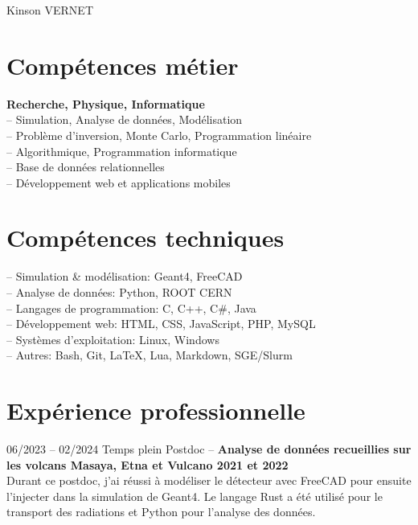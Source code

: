 \documentclass[
	10pt,
]{FreemanCV}
\begin{document}
\begin{paracol}{2}

\parbox[][0.11\textheight][c]{\linewidth}{
	\centering
	{\sffamily\Huge Kinson VERNET}
}


\section{Comp\'etences m\'etier}

\jobentry
	{}
	{}
	{}
	{}
	{\textbf{Recherche, Physique, Informatique}}\\
	{	
	-- Simulation, Analyse de donn\'ees, Mod\'elisation\\
	-- Problème d’inversion, Monte Carlo, Programmation lin\'eaire\\
	-- Algorithmique, Programmation informatique\\
	-- Base de donn\'ees relationnelles\\
	-- D\'eveloppement web et applications mobiles
	}
\medskip


\section{Comp\'etences techniques}

\jobentry
	{}
	{}
	{}
	{}
	{
	-- Simulation \& mod\'elisation: Geant4, FreeCAD\\
	-- Analyse de donn\'ees: Python, ROOT CERN\\
	-- Langages de programmation: C, C++, C\#, Java\\
	-- D\'eveloppement web: HTML, CSS, JavaScript, PHP, MySQL\\
	-- Systèmes d'exploitation: Linux, Windows\\
	-- Autres: Bash, Git, LaTeX, Lua, Markdown, SGE/Slurm
	}
\medskip


\section{Exp\'erience professionnelle}

\jobentry
	{06/2023 -- 02/2024}
	{Temps plein}
	{Postdoc -- \uca}
	{}
	{\textbf{Analyse de donn\'ees recueillies sur les volcans Masaya, Etna et Vulcano 2021 et 2022}}\\
	{
		Durant ce postdoc, j'ai r\'eussi \`a mod\'eliser le d\'etecteur avec FreeCAD pour ensuite l'injecter dans la simulation de Geant4. Le langage Rust a \'et\'e utilis\'e pour le transport des radiations et Python pour l'analyse des donn\'ees.
	}
\medskip
\medskip


\end{paracol}
\end{document}
